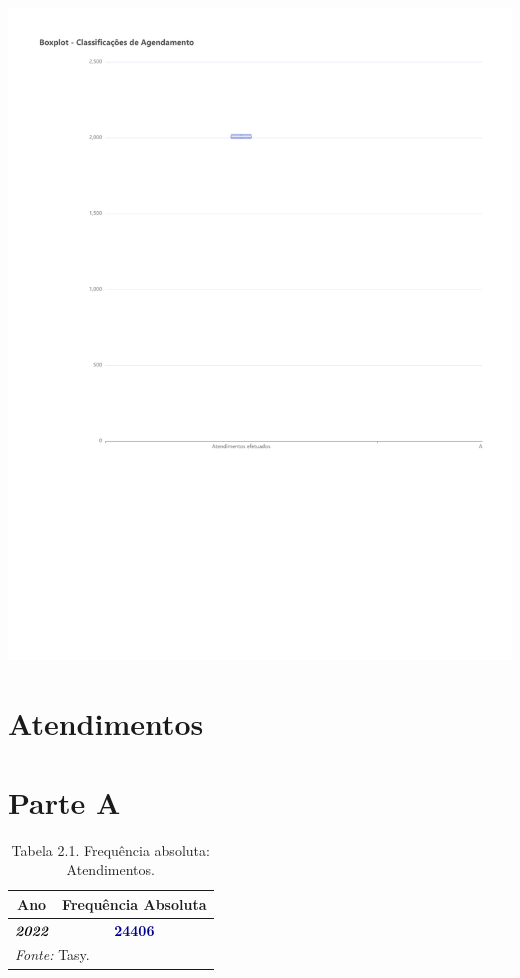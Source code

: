 \documentclass[
  letterpaper,
  DIV=11,
  numbers=noendperiod]{scrreprt}
\begin{document}
\includegraphics{2022_files/figure-pdf/unnamed-chunk-5-1.pdf}

\hypertarget{atendimentos-3}{%
\section*{Atendimentos}\label{atendimentos-3}}


\section{Parte A}

\begin{table}
\centering
\caption{Tabela 2.1. Frequência absoluta: Atendimentos.}
\centering
\begin{tabular}[t]{>{}c|>{}c}
\hline
Ano & Frequência Absoluta\\
\hline
\textcolor{black}{\em{\textbf{2022}}} & \textcolor{darkblue}{\textbf{24406}}\\
\hline
\multicolumn{2}{l}{\rule{0pt}{1em}\textit{Fonte: } Tasy.}\\
\end{tabular}
\end{table}
\end{document}
